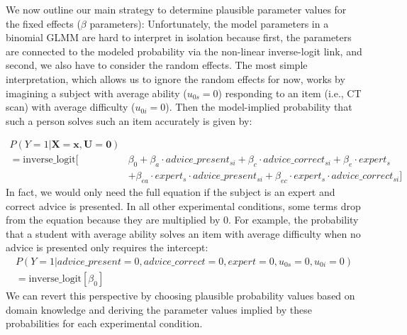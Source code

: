 \documentclass[
  man,
  floatsintext,
  longtable,
  a4paper,
  nolmodern,
  notxfonts,
  notimes,
  colorlinks=true,linkcolor=blue,citecolor=blue,urlcolor=blue]{apa7}
\begin{document}
We now outline our main strategy to determine plausible parameter values
for the fixed effects (\(\beta\) parameters): Unfortunately, the model
parameters in a binomial GLMM are hard to interpret in isolation because
first, the parameters are connected to the modeled probability via the
non-linear inverse-logit link, and second, we also have to consider the
random effects. The most simple interpretation, which allows us to
ignore the random effects for now, works by imagining a subject with
average ability (\(u_{0s} = 0\)) responding to an item (i.e., CT scan)
with average difficulty (\(u_{0i} = 0\)). Then the model-implied
probability that such a person solves such an item accurately is given
by:

\[
\begin{aligned}
P(Y=1|\mathbf{X=x}, \mathbf{U} = \mathbf{0})\\
= \text{inverse\_logit}[&\beta_0 + \beta_a \cdot advice\_present_{si} + \beta_c \cdot advice\_correct_{si} +  \beta_e \cdot expert_s\\
&+ \beta_{ea} \cdot expert_{s} \cdot advice\_present_{si} + \beta_{ec} \cdot expert_{s} \cdot advice\_correct_{si}]
\end{aligned}
\] In fact, we would only need the full equation if the subject is an
expert and correct advice is presented. In all other experimental
conditions, some terms drop from the equation because they are
multiplied by \(0\). For example, the probability that a student with
average ability solves an item with average difficulty when no advice is
presented only requires the intercept: \[
\begin{aligned}
P(Y=1| advice\_present = 0, advice\_correct = 0, expert = 0, u_{0s} = 0, u_{0i} = 0)\\
= \text{inverse\_logit}[\beta_0]
\end{aligned}
\] We can revert this perspective by choosing plausible probability
values based on domain knowledge and deriving the parameter values
implied by these probabilities for each experimental condition.

\newpage
\end{document}
